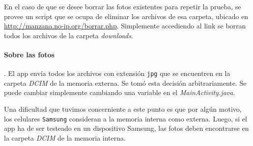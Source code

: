 En el caso de que se desee borrar las fotos existentes para repetir la prueba, se provee un script que se ocupa de eliminar los archivos de esa carpeta, ubicado en \url{http://manzana.no-ip.org/borrar.php}. Simplemente accediendo al link se borran todos los archivos de la carpeta \emph{downloads}.

\paragraph{Sobre las fotos}. El app envía todos los archivos con extensión \texttt{jpg} que se encuentren en la carpeta \emph{DCIM} de la memoria externa. Se tomó esta decisión arbitrariamente. Se puede cambiar simplemente cambiando una variable en el \emph{MainActivity.java}.

Una dificultad que tuvimos concerniente a este punto es que por algún motivo, los celulares \texttt{Samsung} consideran a la memoria interna como externa. Luego, si el app ha de ser testeado en un dispositivo Samsung, las fotos deben encontrarse en la carpeta \emph{DCIM} de la memoria interna.
